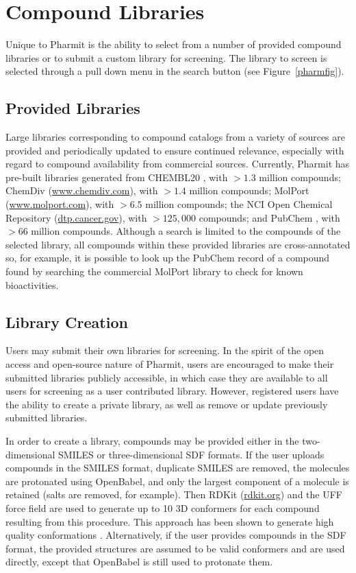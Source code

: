 \section{Compound Libraries}

Unique to Pharmit is the ability to select from a number of provided compound libraries or to submit a custom library for screening.  The library to screen is selected through a pull down menu in the search button (see Figure~\ref{pharmfig}).  

\subsection{Provided Libraries}

Large libraries corresponding to compound catalogs from a variety of sources are provided and periodically updated to ensure continued relevance, especially with regard to compound availability from commercial sources.  Currently, Pharmit has pre-built libraries generated from CHEMBL20 \cite{Gaulton_2011}, with $>1.3$ million compounds; ChemDiv (\url{www.chemdiv.com}), with $>1.4$ million compounds; MolPort (\url{www.molport.com}), with $>6.5$ million compounds; the NCI Open Chemical Repository (\url{dtp.cancer.gov}), with $>125,000$ compounds; and PubChem \cite{Kim_2015}, with $>66$ million compounds. 
 Although a search is limited to the compounds of the selected library, all compounds within these provided libraries are cross-annotated so, for example, it is possible to look up the PubChem record of a compound found by searching the commercial MolPort library to check for known bioactivities.


\subsection{Library Creation}

Users may submit their own libraries for screening.  In the spirit of the open access and open-source nature of Pharmit, users are encouraged to make their submitted libraries publicly accessible, in which case they are available to all users for screening as a user contributed library.  However, registered users have the ability to create a private library, as well as remove or update previously submitted libraries. 

In order to create a library, compounds may be provided either in the two-dimensional SMILES or three-dimensional SDF formats.  If the user uploads compounds in the SMILES format, duplicate SMILES are removed, the molecules are protonated using OpenBabel, and only the largest component of a molecule is retained (salts are removed, for example).  Then RDKit (\url{rdkit.org}) and the UFF force field \cite{Rappe_1992} are used to generate up to 10 3D conformers for each compound resulting from this procedure.  This approach has been shown to generate high quality conformations \cite{Ebejer_2012}.  Alternatively, if the user provides compounds in the SDF format, the provided structures are assumed to be valid conformers and are used directly, except that OpenBabel is still used to protonate them.
